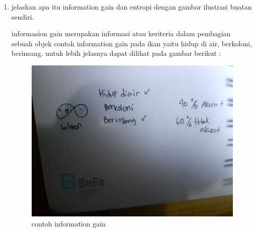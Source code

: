 \begin{enumerate}
		\item jelaskan apa itu information gain dan entropi dengan gambar ilustrasi buatan sendiri.\par
		informasion gain merupakan informasi atau keriteria dalam pembagian sebuah objek contoh information gain pada ikan yaitu hidup di air, berkoloni, berinsang. untuk lebih jelasnya dapat dilihat pada gambar berikut :\par
		\begin{figure}[ht]
			\centering
			\includegraphics[scale=0.01]{figures/1174043/chapter2/9.jpg}
			\caption{contoh information gain}
			\label{contoh}
		\end{figure}
	\end{enumerate}
		
